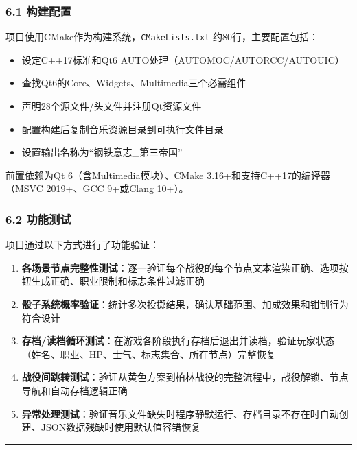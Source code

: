 \hypertarget{ux6784ux5efaux914dux7f6e}{%
\subsubsection{6.1 构建配置}\label{ux6784ux5efaux914dux7f6e}}

项目使用CMake作为构建系统，\texttt{CMakeLists.txt}
约80行，主要配置包括：

\begin{itemize}
\tightlist
\item
  设定C++17标准和Qt6 AUTO处理（AUTOMOC/AUTORCC/AUTOUIC）
\item
  查找Qt6的Core、Widgets、Multimedia三个必需组件
\item
  声明28个源文件/头文件并注册Qt资源文件
\item
  配置构建后复制音乐资源目录到可执行文件目录
\item
  设置输出名称为``钢铁意志\_第三帝国''
\end{itemize}

前置依赖为Qt 6（含Multimedia模块）、CMake 3.16+和支持C++17的编译器（MSVC
2019+、GCC 9+或Clang 10+）。

\hypertarget{ux529fux80fdux6d4bux8bd5}{%
\subsubsection{6.2 功能测试}\label{ux529fux80fdux6d4bux8bd5}}

项目通过以下方式进行了功能验证：

\begin{enumerate}
\def\labelenumi{\arabic{enumi}.}
\tightlist
\item
  \textbf{各场景节点完整性测试}：逐一验证每个战役的每个节点文本渲染正确、选项按钮生成正确、职业限制和标志条件过滤正确
\item
  \textbf{骰子系统概率验证}：统计多次投掷结果，确认基础范围、加成效果和钳制行为符合设计
\item
  \textbf{存档/读档循环测试}：在游戏各阶段执行存档后退出并读档，验证玩家状态（姓名、职业、HP、士气、标志集合、所在节点）完整恢复
\item
  \textbf{战役间跳转测试}：验证从黄色方案到柏林战役的完整流程中，战役解锁、节点导航和自动存档逻辑正确
\item
  \textbf{异常处理测试}：验证音乐文件缺失时程序静默运行、存档目录不存在时自动创建、JSON数据残缺时使用默认值容错恢复
\end{enumerate}

\begin{center}\rule{0.5\linewidth}{0.5pt}\end{center}

